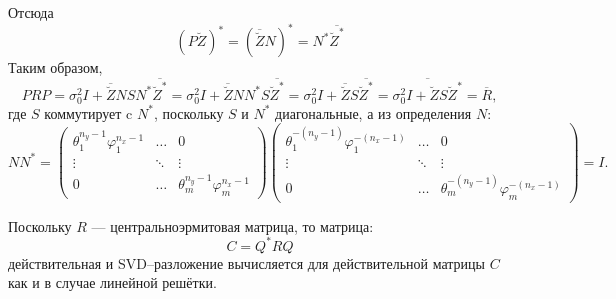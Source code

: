 Отсюда
\[
    \left( P \breve{Z} \right)^*
    = \left( \overline{\breve{Z}} N \right)^*
    = N^* \overline{\breve{Z}^*}
\]
Таким образом,
\[
    P R P
    = \sigma_0^2 I + \overline{\breve{Z}} N S N^* \overline{\breve{Z}^*}
    = \sigma_0^2 I + \overline{\breve{Z}} N N^* S \overline{\breve{Z}^*}
    = \sigma_0^2 I + \overline{\breve{Z}} S \overline{\breve{Z}^*}
    = \overline{\sigma_0^2 I + \breve{Z} S \breve{Z}^*}
    = \overline{R} ,
\]
где $S$ коммутирует c $N^*$, поскольку $S$ и $N^*$ диагональные, а из определения $N$:
\[
    N N^*
    =
    \begin{pmatrix}
        \theta_1^{n_y - 1} \varphi_1^{n_x - 1} & \dots  & 0                                      \\
        \vdots                                 & \ddots & \vdots                                 \\
        0                                      & \dots  & \theta_m^{n_y - 1} \varphi_m^{n_x - 1}
    \end{pmatrix}
    \begin{pmatrix}
        \theta_1^{-(n_y - 1)} \varphi_1^{-(n_x - 1)} & \dots  & 0                                            \\
        \vdots                                       & \ddots & \vdots                                       \\
        0                                            & \dots  & \theta_m^{-(n_y - 1)} \varphi_m^{-(n_x - 1)}
    \end{pmatrix}
    = I .
\]

Поскольку $R$ --- центральноэрмитовая матрица, то матрица:
\[
    C = Q^* R Q
\]
действительная и SVD--разложение вычисляется для действительной матрицы $C$ как и в случае линейной решётки.

